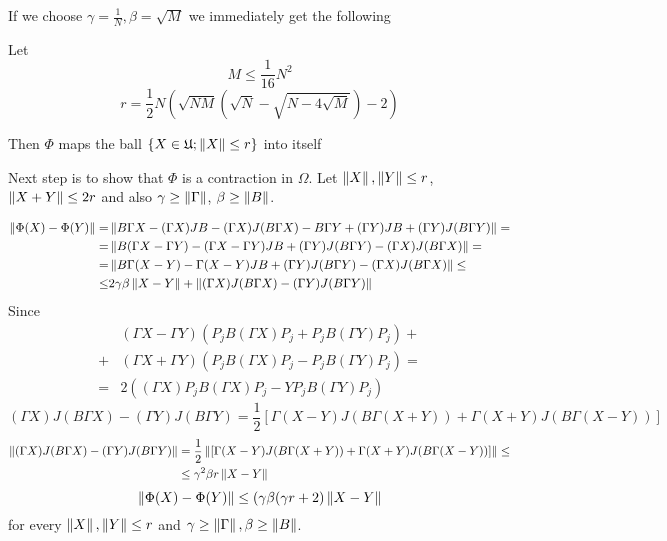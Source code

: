 \documentclass{article}
\begin{document}
If we choose $\gamma=\frac{1}{N}, \beta=\sqrt{M}$ we immediately get the following
\begin{corollary}\label{thm:endo_nm}
    Let
    \begin{equation}\label{eq:phi_endo_nm_condition}
        M \leq \frac{1}{16} N^2
    \end{equation}
    \begin{equation}\label{eq:phi_endo_nm_radia}
        r = \frac12 N
        \left(
        \sqrt{NM}(\sqrt{N} - \sqrt{N-4\sqrt{M}}) - 2
        \right)
    \end{equation}

    Then
    $\Phi$ maps the ball $\{ X\in\mathfrak U; \left\|{X}\right\| \leq r \}$ into itself
\end{corollary}

Next step is to show that $\Phi$ is a contraction in $\Omega$.
Let $\left\|{X}\right\|, \left\|{Y}\right\| \leq r$, $\left\|{X+Y}\right\| \leq 2r$ and also $\gamma\geq\left\|{\Gamma}\right\|$, $\beta\geq\left\|{B}\right\|$.

\begin{align*}
    \left\|{\Phi(X) - \Phi(Y)}\right\|
    =& \left\|{B\Gamma X - (\Gamma X)JB - (\Gamma X)J(B\Gamma X) - B\Gamma Y + (\Gamma Y)JB + (\Gamma Y)J(B\Gamma Y)}\right\| = \\
    =& \left\|{B(\Gamma X - \Gamma Y) - (\Gamma X - \Gamma Y) JB + (\Gamma Y) J(B\Gamma Y) - (\Gamma X)J(B\Gamma X)}\right\| = \\
    =& \left\|{B\Gamma(X-Y) - \Gamma(X-Y)JB + (\Gamma Y) J(B\Gamma Y) - (\Gamma X)J(B\Gamma X)}\right\| \leq \\
    \leq& 2\gamma\beta\left\|{X-Y}\right\| + \left\|{(\Gamma X)J(B\Gamma X) - (\Gamma Y) J(B\Gamma Y)}\right\|
\end{align*}
Since 
\begin{align*}
    &(\Gamma X - \Gamma Y)(P_jB(\Gamma X)P_j + P_jB(\Gamma Y)P_j) + \\
    + &(\Gamma X + \Gamma Y)(P_jB(\Gamma X)P_j - P_jB(\Gamma Y)P_j) = \\
= &2((\Gamma X)P_jB(\Gamma X)P_j- YP_jB(\Gamma Y)P_j)\end{align*}
$$(\Gamma X)J(B\Gamma X) - (\Gamma Y) J(B\Gamma Y)
= \frac12\left[\Gamma(X-Y)J(B\Gamma(X+Y)) + \Gamma(X+Y)J(B\Gamma(X-Y))\right]$$
\begin{align*}
    \left\|{(\Gamma X)J(B\Gamma X) - (\Gamma Y) J(B\Gamma Y)}\right\|
    &= \frac12\left\|{\left[\Gamma(X-Y)J(B\Gamma(X+Y)) + \Gamma(X+Y)J(B\Gamma(X-Y))\right]}\right\|\leq \\
    &\leq \gamma^2\beta r \left\|{X-Y}\right\|
\end{align*}
$$\left\|{\Phi(X) - \Phi(Y)}\right\| \leq (\gamma\beta(\gamma r + 2)\left\|{X-Y}\right\|$$
for every $\left\|{X}\right\|, \left\|{Y}\right\| \leq r$ and $\gamma\geq\left\|{\Gamma}\right\|, \beta\geq\left\|{B}\right\|$.
\end{document}
